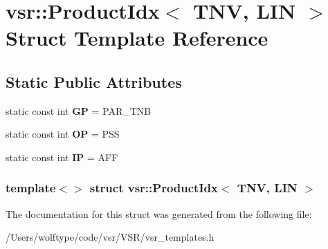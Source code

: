 \hypertarget{structvsr_1_1_product_idx_3_01_t_n_v_00_01_l_i_n_01_4}{\section{vsr\-:\-:Product\-Idx$<$ T\-N\-V, L\-I\-N $>$ Struct Template Reference}
\label{structvsr_1_1_product_idx_3_01_t_n_v_00_01_l_i_n_01_4}
}
\subsection*{Static Public Attributes}
\begin{DoxyCompactItemize}
\item 
\hypertarget{structvsr_1_1_product_idx_3_01_t_n_v_00_01_l_i_n_01_4_a67abcf9b860890f92d6b4316e2617026}{static const int {\bfseries G\-P} = P\-A\-R\-\_\-\-T\-N\-B}\label{structvsr_1_1_product_idx_3_01_t_n_v_00_01_l_i_n_01_4_a67abcf9b860890f92d6b4316e2617026}

\item 
\hypertarget{structvsr_1_1_product_idx_3_01_t_n_v_00_01_l_i_n_01_4_ac331f3ae8b8b191850abe7b23473f9ad}{static const int {\bfseries O\-P} = P\-S\-S}\label{structvsr_1_1_product_idx_3_01_t_n_v_00_01_l_i_n_01_4_ac331f3ae8b8b191850abe7b23473f9ad}

\item 
\hypertarget{structvsr_1_1_product_idx_3_01_t_n_v_00_01_l_i_n_01_4_aa9246d3b2ad78ad37029bfad6eb25442}{static const int {\bfseries I\-P} = A\-F\-F}\label{structvsr_1_1_product_idx_3_01_t_n_v_00_01_l_i_n_01_4_aa9246d3b2ad78ad37029bfad6eb25442}

\end{DoxyCompactItemize}
\subsubsection*{template$<$$>$ struct vsr\-::\-Product\-Idx$<$ T\-N\-V, L\-I\-N $>$}



The documentation for this struct was generated from the following file\-:\begin{DoxyCompactItemize}
\item 
/\-Users/wolftype/code/vsr/\-V\-S\-R/vsr\-\_\-templates.\-h\end{DoxyCompactItemize}
